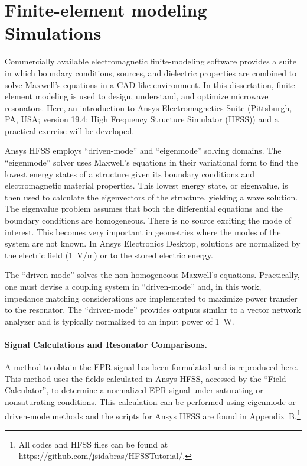 \section{Finite-element modeling Simulations}
Commercially available electromagnetic finite-modeling software provides a suite in which boundary conditions, sources, and dielectric properties are combined to solve Maxwell's equations in a CAD-like environment. In this dissertation, finite-element modeling is used to design, understand, and optimize microwave resonators. Here, an introduction to Ansys Electromagnetics Suite (Pittsburgh, PA, USA; version 19.4; High Frequency Structure Simulator (HFSS)) and a practical exercise will be developed. 

Ansys HFSS employs ``driven-mode'' and ``eigenmode'' solving domains. The ``eigenmode'' solver uses Maxwell's equations in their variational form to find the lowest energy states of a structure given its boundary conditions and electromagnetic material properties. \cite{sadiku2000numerical,jin2015finite} This lowest energy state, or eigenvalue, is then used to calculate the eigenvectors of the structure, yielding a wave solution. The eigenvalue problem assumes that both the differential equations and the boundary conditions are homogeneous. There is no source exciting the mode of interest. This becomes very important in geometries where the modes of the system are not known. In Ansys Electronics Desktop, solutions are normalized by the electric field (1~V/m) or to the stored electric energy.

The ``driven-mode'' solves the non-homogeneous Maxwell's equations. Practically, one must devise a coupling system in ``driven-mode'' and, in this work, impedance matching considerations are implemented to maximize power transfer to the resonator. The ``driven-mode'' provides outputs similar to a vector network analyzer and is typically normalized to an input power of 1~W. 

\paragraph*{Signal Calculations and Resonator Comparisons.}
A method to obtain the EPR signal has been formulated and is reproduced here. \cite{misrabook} This method uses the fields calculated in Ansys HFSS, accessed by the ``Field Calculator'', to determine a normalized EPR signal under saturating or nonsaturating conditions. This calculation can be performed using eigenmode or driven-mode methods and the scripts for Ansys HFSS are found in Appendix~B.\footnote{All codes and HFSS files can be found at https://github.com/jsidabras/HFSSTutorial/.} 


